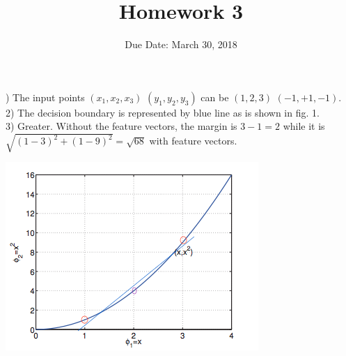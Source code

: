 \documentclass[12pt]{article}
\newenvironment{solution}[2][Solution]{\begin{trivlist}
\item[\hskip \labelsep {\bfseries #1}\hskip \labelsep {\bfseries #2.}]}{\end{trivlist}}
\begin{document}
\title{Homework 3}
\author{Due Date: March 30, 2018}
\date{}

\maketitle

\begin{solution}{1}
1) The input points $(x_1, x_2, x_3)$ $(y_1, y_2, y_3)$ can be $(1,2,3)$ $(-1, +1, -1)$. \\
2) The decision boundary is represented by blue line as is shown in fig. 1.\\
3) Greater. Without the feature vectors, the margin is $3-1 = 2$ while it is $\sqrt{(1-3)^2 + (1-9)^2} = \sqrt{68}$ with feature vectors. 
\begin{center}
\includegraphics[angle = 0, width = .7\textwidth]{./images/fig1.png}
\end{center}

\end{solution}
\end{document}
